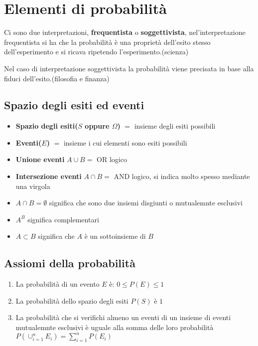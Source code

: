 

\chapter{Elementi di probabilità}

Ci sono due interpretazioni, \textbf{frequentista} o \textbf{soggettivista}, nel'interpretazione 
frequentista si ha che la probabilità è una proprietà dell'esito stesso dell'esperimento
e si ricava ripetendo l'esperimento.(scienza)

Nel caso di interpretazione soggettivista la probabilità viene precisata in base alla fiduci dell'esito.(filosofia e finanza)

\section{Spazio degli esiti ed eventi}

\begin{itemize}
    \item \textbf{Spazio degli esiti($S$ oppure $\Omega$)} $=$ insieme degli esiti possibili
    \item \textbf{Eventi($E$)} $=$ insieme i cui elementi sono esiti possibili 
    \item \textbf{Unione eventi} $A\cup B=$ OR logico
    \item \textbf{Intersezione eventi} $A\cap B=$ AND logico, si indica molto spesso mediante una virgola
    \item \textbf{$A\cap B = \emptyset$} significa che sono due insiemi disgiunti o mutualemnte esclusivi
    \item \textbf{$A^B$} significa complementari
    \item \textbf{$A \subset B$} significa che $A$ è un sottoinsieme di $B$
\end{itemize}


\section{Assiomi della probabilità}

\begin{enumerate}
    \item La probabilità di un evento $E$ è: $0 \leq P(E) \leq 1$
    \item La probabilità dello spazio degli esiti $P(S)$ è $1$  
    \item La probabilità che si verifichi almeno un eventi di un insieme di eventi mutualemnte esclusivi è uguale alla somma delle loro probabilità
    $P(\displaystyle\cup_{i = 1}^n E_i) = \displaystyle\sum_{i = 1}^{n} P(E_i)$
\end{enumerate}

